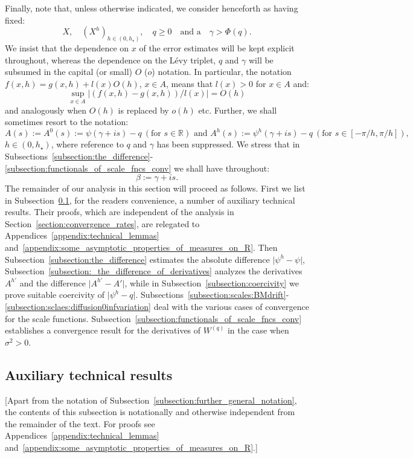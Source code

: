 \documentclass[pdftex,oneside,11pt,reqno]{amsart}
\theoremstyle{definition}
\theoremstyle{theorem}
\theoremstyle{remark}
\numberwithin{equation}{section}
\numberwithin{definition}{section}
\begin{document}
Finally, note that, unless otherwise indicated, we consider henceforth as having fixed:
\begin{equation*}
X,\quad (X^h)_{h\in (0,h_\star)}, \quad q\geq 0\quad \text{and a}\quad \gamma>\Phi(q).
\end{equation*} 
We insist that the dependence on $x$ of the error estimates will be kept explicit throughout, whereas the dependence on the L\'evy triplet, $q$  and $\gamma$ will be subsumed in the capital (or small) $O$ ($o$) notation. In particular, the notation $f(x,h)=g(x,h)+l(x)O(h)$, $x\in A$, means that $l(x)>0$ for $x\in A$ and: $$\sup_{x\in A}\vert (f(x,h)-g(x,h))/l(x)\vert=O(h)$$ and analogously when $O(h)$ is replaced by $o(h)$ etc. Further, we shall sometimes resort to the notation: $$A(s):=A^0(s):=\psi(\gamma+is)-q\ (\text{for }s\in \mathbb{R})\text{ and }A^h(s):=\psi^h(\gamma+is)-q\ (\text{for }s\in [-\pi/h,\pi/h]),$$ $h\in (0,h_\star)$, where reference to $q$ and $\gamma$ has been suppressed. We stress that in Subsections~\ref{subsection:the_difference}-\ref{subsection:functionals_of_scale_fncs_conv} we shall have throughout: 
\begin{equation*}
\beta:=\gamma+is.
\end{equation*}
\noindent The remainder of our analysis in this section will proceed as follows. First we list in Subsection~\ref{subsection:auxiliary_technical_results}, for the readers convenience, a number of auxiliary technical results.
Their proofs, which are independent of the analysis in Section~\ref{section:convergence_rates}, are relegated to Appendices~\ref{appendix:technical_lemmas} and~\ref{appendix:some_asymptotic_properties_of_measures_on_R}. Then Subsection~\ref{subsection:the_difference} estimates the absolute difference $\vert \psi^h-\psi\vert$, Subsection~\ref{subsection:_the_difference_of_derivatives} analyzes the derivatives $A^{h\prime}$ and the difference $\vert A^{h\prime}-A'\vert$, while in Subsection~\ref{subsection:coercivity} we prove suitable coercivity of $\vert \psi^h-q\vert$. Subsections~\ref{subsection:scales:BMdrift}-\ref{subsection:sclaes:diffusion0infvariation} deal with the various cases of convergence for the scale functions. Subsection~\ref{subsection:functionals_of_scale_fncs_conv}  establishes a convergence result for the derivatives of ${W^{(q)}}$ in the case when ${\sigma^2}>0$. 

\subsection{Auxiliary technical results}\label{subsection:auxiliary_technical_results}
[Apart from the notation of Subsection~\ref{subsection:further_general_notation}, the contents of this subsection is notationally and otherwise independent from the remainder of the text. For proofs see Appendices~\ref{appendix:technical_lemmas} and~\ref{appendix:some_asymptotic_properties_of_measures_on_R}.]
\end{document}

